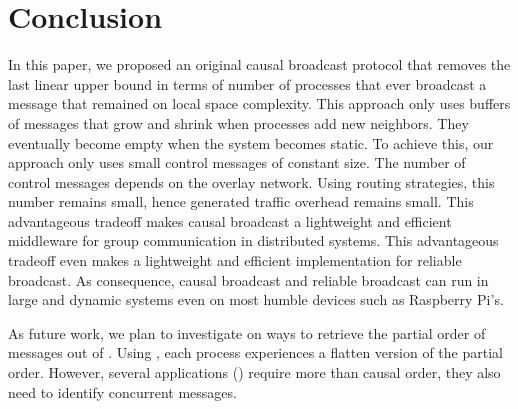 
\section{Conclusion}
\label{sec:conclusion}


In this paper, we proposed an original causal broadcast protocol that removes
the last linear upper bound in terms of number of processes that ever broadcast
a message that remained on local space complexity. This approach only uses
buffers of messages that grow and shrink when processes add new neighbors. They
eventually become empty when the system becomes static. To achieve this, our
approach only uses small control messages of constant size. The number of
control messages depends on the overlay network. Using routing strategies, this
number remains small, hence generated traffic overhead remains small. This
advantageous tradeoff makes causal broadcast a lightweight and efficient
middleware for group communication in distributed systems. This advantageous
tradeoff even makes \RPCBROADCAST a lightweight and efficient implementation
for reliable broadcast. As consequence, causal broadcast and reliable broadcast
can run in large and dynamic systems even on most humble devices such as
Raspberry Pi’s.

As future work, we plan to investigate on ways to retrieve the partial order of
messages out of \RPCBROADCAST. Using \RPCBROADCAST, each process experiences a
flatten version of the partial order. However, several applications (\REF)
require more than causal order, they also need to identify concurrent 
messages. 


